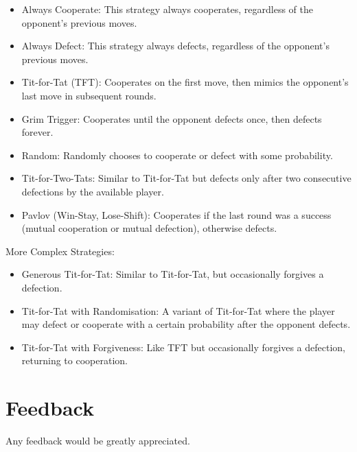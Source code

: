 \documentclass[11pt,preprint]{elsarticle}
\numberwithin{equation}{section}
\numberwithin{figure}{section}
\numberwithin{table}{section}
\begin{document}
\begin{itemize}
\item
  Always Cooperate: This strategy always cooperates, regardless of the
  opponent's previous moves.
\item
  Always Defect: This strategy always defects, regardless of the
  opponent's previous moves.
\item
  Tit-for-Tat (TFT): Cooperates on the first move, then mimics the
  opponent's last move in subsequent rounds.
\item
  Grim Trigger: Cooperates until the opponent defects once, then defects
  forever.
\item
  Random: Randomly chooses to cooperate or defect with some probability.
\item
  Tit-for-Two-Tats: Similar to Tit-for-Tat but defects only after two
  consecutive defections by the available player.
\item
  Pavlov (Win-Stay, Lose-Shift): Cooperates if the last round was a
  success (mutual cooperation or mutual defection), otherwise defects.
\end{itemize}

More Complex Strategies:

\begin{itemize}
\item
  Generous Tit-for-Tat: Similar to Tit-for-Tat, but occasionally
  forgives a defection.
\item
  Tit-for-Tat with Randomisation: A variant of Tit-for-Tat where the
  player may defect or cooperate with a certain probability after the
  opponent defects.
\item
  Tit-for-Tat with Forgiveness: Like TFT but occasionally forgives a
  defection, returning to cooperation.
\end{itemize}

\section{Feedback}\label{feedback}

Any feedback would be greatly appreciated.

\newpage
\end{document}
